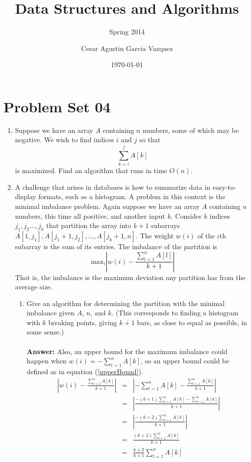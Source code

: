 \documentclass[tikz, 12pt]{scrartcl}
\title{Data Structures and Algorithms}
\subtitle{Spring 2014}
\author{Cesar Agustin Garcia Vazquez}
\date{\today}                                           %
\begin{document}
\maketitle
\section{Problem Set 04}

\begin{enumerate}
	\item Suppose we have an array $A$ containing $n$ numbers, some of which may be negative. We wish to find indices $i$ and $j$ so that
	$$\sum_{k = i}^{j}A[k]$$
is maximized. Find an algorithm that runs in time $O(n)$.

	\item A challenge that arises in databases is how to summarize data in easy-to-display formats, such as a histogram. A problem in this context is the minimal imbalance problem. Again suppose we have an array $A$ containing $n$ numbers, this time all positive, and another input $k$. 
	Consider $k$ indices $j_1, j_2 \ldots, j_k$ that partition the array into $k + 1$ subarrays $A[1, j_1], A[j_1 + 1, j_2], \ldots, A[j_k + 1, n]$. The weight $w(i)$ of the $i$th subarray is the sum of its entries. The imbalance of the partition is
	$$
	\text{max}_i \left| w(i) - \frac{\sum_{l = 1}^n A[l]}{k + 1} \right|
	$$
That is, the imbalance is the maximum deviation any partition has from the average size.\\
	\begin{enumerate}
		\item Give an algorithm for determining the partition with the minimal imbalance given $A$, $n$, and $k$. (This corresponds to finding a histogram with $k$ breaking points, giving $k + 1$ bars, as close to equal as possible, in some sense.) \\
		\\
		\textbf{Answer: }
		Also, an upper bound for the maximum imbalance could happen when $w(i) = -\sum_{l = 1}^nA[k]$,  so an upper bound could be defined as in equation (\ref{upperBound}).
		\begin{eqnarray}
		\left| w(i) - \frac{\sum_{l = 1}^n A[k]}{k + 1} \right|	&	=	&	\left| - \sum_{l = 1}^n A[k] - \frac{\sum_{l = 1}^n A[k]}{k + 1} \right| \nonumber \\
			&	=	&	\left| \frac{-(k + 1)\sum_{l = 1}^n A[k] - \sum_{l = 1}^n A[k]}{k + 1}\right| \nonumber \\
			& 	=	&	\left|  \frac{-(k + 2)\sum_{l = 1}^n A[k]}{k + 1}\right| \nonumber \\
			& 	=	&	\frac{(k + 2)\sum_{l = 1}^n A[k]}{k + 1}\nonumber \\
			& 	=	&	\frac{k + 2}{k + 1}\sum_{l = 1}^n A[k] \label{upperBound}
		\end{eqnarray}


\end{enumerate}
\end{enumerate}
\end{document}
